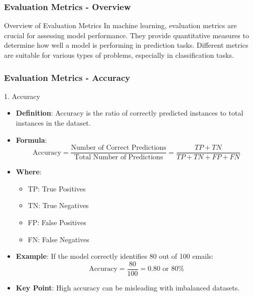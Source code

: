 \documentclass[aspectratio=169]{beamer}
\begin{document}
\begin{frame}[fragile]
    \frametitle{Evaluation Metrics - Overview}
    \begin{block}{Overview of Evaluation Metrics}
        In machine learning, evaluation metrics are crucial for assessing model performance. 
        They provide quantitative measures to determine how well a model is performing in prediction tasks.
        Different metrics are suitable for various types of problems, especially in classification tasks.
    \end{block}
\end{frame}

\begin{frame}[fragile]
    \frametitle{Evaluation Metrics - Accuracy}
    \begin{block}{1. Accuracy}
        \begin{itemize}
            \item \textbf{Definition}: Accuracy is the ratio of correctly predicted instances to total instances in the dataset.
            \item \textbf{Formula}:
            \begin{equation}
            \text{Accuracy} = \frac{\text{Number of Correct Predictions}}{\text{Total Number of Predictions}} = \frac{TP + TN}{TP + TN + FP + FN}
            \end{equation}
            \item \textbf{Where}:
            \begin{itemize}
                \item TP: True Positives
                \item TN: True Negatives
                \item FP: False Positives
                \item FN: False Negatives
            \end{itemize}
            \item \textbf{Example}: If the model correctly identifies 80 out of 100 emails:
            \begin{equation}
            \text{Accuracy} = \frac{80}{100} = 0.80 \text{ or } 80\%
            \end{equation}
            \item \textbf{Key Point}: High accuracy can be misleading with imbalanced datasets.
        \end{itemize}
    \end{block}
\end{frame}
\end{document}
